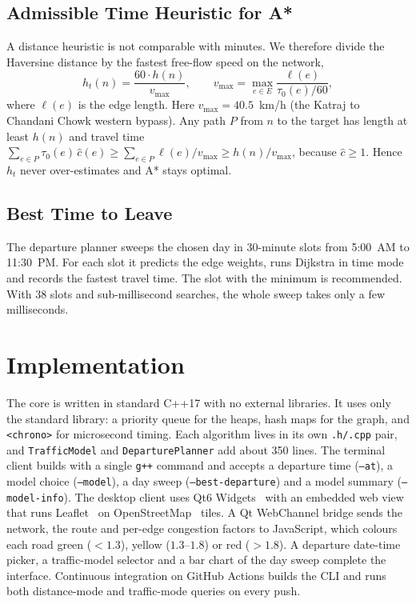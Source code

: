 \documentclass[conference]{IEEEtran}
\begin{document}
\subsection{Admissible Time Heuristic for A*}
A distance heuristic is not comparable with minutes. We therefore divide
the Haversine distance by the fastest free-flow speed on the network,
\begin{equation}
  h_t(n) = \frac{60 \cdot h(n)}{v_{\max}},\qquad
  v_{\max} = \max_{e\in E}\frac{\ell(e)}{\tau_0(e)/60},
\end{equation}
where $\ell(e)$ is the edge length. Here $v_{\max}=40.5$~km/h (the Katraj
to Chandani Chowk western bypass). Any path $P$ from $n$ to the target
has length at least $h(n)$ and travel time
$\sum_{e\in P}\tau_0(e)\,\hat{c}(e) \ge \sum_{e\in P}\ell(e)/v_{\max}
\ge h(n)/v_{\max}$, because $\hat{c}\ge 1$. Hence $h_t$ never
over-estimates and A* stays optimal.

\subsection{Best Time to Leave}
The departure planner sweeps the chosen day in 30-minute slots from
5:00~AM to 11:30~PM. For each slot it predicts the edge weights, runs
Dijkstra in time mode and records the fastest travel time. The slot with
the minimum is recommended. With 38 slots and sub-millisecond searches,
the whole sweep takes only a few milliseconds.

\section{Implementation}\label{sec:impl}

The core is written in standard C++17 with no external libraries. It
uses only the standard library: a priority queue for the heaps, hash
maps for the graph, and \texttt{<chrono>} for microsecond timing. Each
algorithm lives in its own
\texttt{.h/.cpp} pair, and \texttt{TrafficModel} and
\texttt{DeparturePlanner} add about 350 lines. The terminal client builds
with a single \texttt{g++} command and accepts a departure time
(\texttt{--at}), a model choice (\texttt{--model}), a day sweep
(\texttt{--best-departure}) and a model summary (\texttt{--model-info}). The desktop client
uses Qt6 Widgets~\cite{qt6} with an embedded web view that runs
Leaflet~\cite{leaflet} on OpenStreetMap~\cite{osm} tiles. A Qt WebChannel
bridge sends the network, the route and per-edge congestion factors to
JavaScript, which colours each road green ($<1.3$), yellow
($1.3$--$1.8$) or red ($>1.8$). A departure date-time picker, a
traffic-model selector and a bar chart of the day sweep complete the
interface. Continuous integration on GitHub Actions builds the CLI and
runs both distance-mode and traffic-mode queries on every push.
\end{document}
